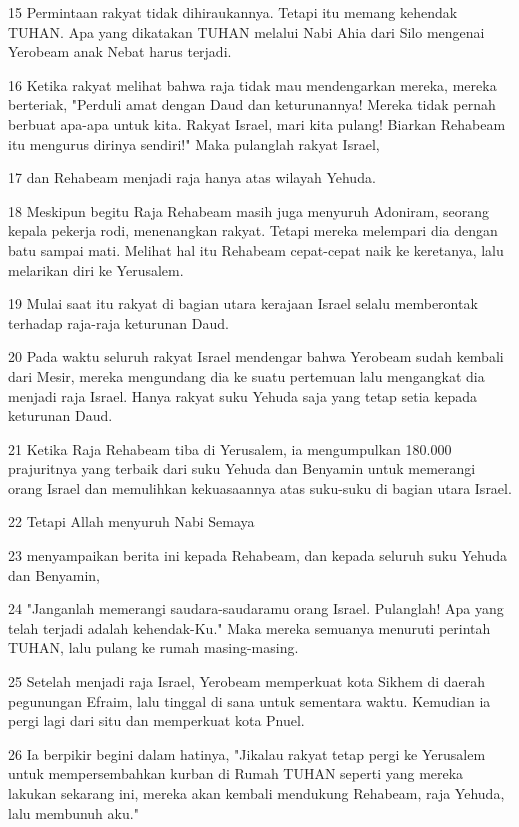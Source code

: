 \par 15 Permintaan rakyat tidak dihiraukannya. Tetapi itu memang kehendak TUHAN. Apa yang dikatakan TUHAN melalui Nabi Ahia dari Silo mengenai Yerobeam anak Nebat harus terjadi.
\par 16 Ketika rakyat melihat bahwa raja tidak mau mendengarkan mereka, mereka berteriak, "Perduli amat dengan Daud dan keturunannya! Mereka tidak pernah berbuat apa-apa untuk kita. Rakyat Israel, mari kita pulang! Biarkan Rehabeam itu mengurus dirinya sendiri!" Maka pulanglah rakyat Israel,
\par 17 dan Rehabeam menjadi raja hanya atas wilayah Yehuda.
\par 18 Meskipun begitu Raja Rehabeam masih juga menyuruh Adoniram, seorang kepala pekerja rodi, menenangkan rakyat. Tetapi mereka melempari dia dengan batu sampai mati. Melihat hal itu Rehabeam cepat-cepat naik ke keretanya, lalu melarikan diri ke Yerusalem.
\par 19 Mulai saat itu rakyat di bagian utara kerajaan Israel selalu memberontak terhadap raja-raja keturunan Daud.
\par 20 Pada waktu seluruh rakyat Israel mendengar bahwa Yerobeam sudah kembali dari Mesir, mereka mengundang dia ke suatu pertemuan lalu mengangkat dia menjadi raja Israel. Hanya rakyat suku Yehuda saja yang tetap setia kepada keturunan Daud.
\par 21 Ketika Raja Rehabeam tiba di Yerusalem, ia mengumpulkan 180.000 prajuritnya yang terbaik dari suku Yehuda dan Benyamin untuk memerangi orang Israel dan memulihkan kekuasaannya atas suku-suku di bagian utara Israel.
\par 22 Tetapi Allah menyuruh Nabi Semaya
\par 23 menyampaikan berita ini kepada Rehabeam, dan kepada seluruh suku Yehuda dan Benyamin,
\par 24 "Janganlah memerangi saudara-saudaramu orang Israel. Pulanglah! Apa yang telah terjadi adalah kehendak-Ku." Maka mereka semuanya menuruti perintah TUHAN, lalu pulang ke rumah masing-masing.
\par 25 Setelah menjadi raja Israel, Yerobeam memperkuat kota Sikhem di daerah pegunungan Efraim, lalu tinggal di sana untuk sementara waktu. Kemudian ia pergi lagi dari situ dan memperkuat kota Pnuel.
\par 26 Ia berpikir begini dalam hatinya, "Jikalau rakyat tetap pergi ke Yerusalem untuk mempersembahkan kurban di Rumah TUHAN seperti yang mereka lakukan sekarang ini, mereka akan kembali mendukung Rehabeam, raja Yehuda, lalu membunuh aku."
